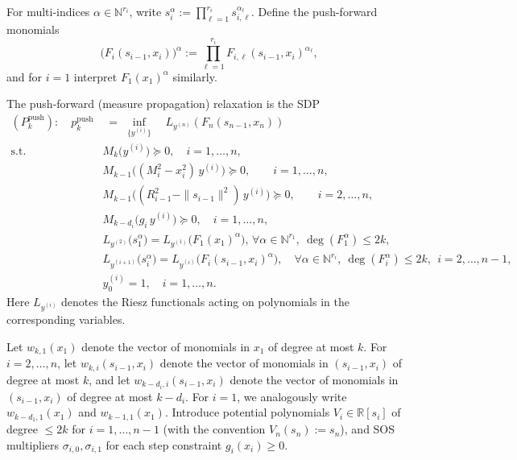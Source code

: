 \documentclass[11pt,a4paper]{article}
\theoremstyle{definition}
\begin{document}
For multi-indices $\alpha\in\mathbb{N}^{r_i}$, write $s_i^\alpha:=\prod_{\ell=1}^{r_i} s_{i,\ell}^{\alpha_\ell}$.
Define the push-forward monomials
\[
\big(F_i(s_{i-1},x_i)\big)^\alpha := \prod_{\ell=1}^{r_i} F_{i,\ell}(s_{i-1},x_i)^{\alpha_\ell},
\]
and for $i=1$ interpret $F_1(x_1)^\alpha$ similarly.

The push-forward (measure propagation) relaxation is the SDP
\begin{equation}\label{eq:push-forward-primal}
\begin{aligned}
(P_k^{\mathrm{push}}):\quad 
p_k^{\mathrm{push}}& \;=\; \inf_{\{y^{(i)}\}}
\quad L_{y^{(n)}}(F_n(s_{n-1},x_n)) \\
\text{s.t.}\quad 
& M_k\!\big(y^{(i)}\big)\succeq 0,\quad i=1,\dots,n, \\
& M_{k-1}\bigl((M_i^2-x_i^2)\,y^{(i)}\bigr) \succeq 0,\qquad i=1,\dots,n,\\
& M_{k-1}\bigl((R_{i-1}^2-\|s_{i-1}\|^2)\,y^{(i)}\bigr) \succeq 0,\qquad i=2,\dots,n,\\
& M_{k-d_i}\!\big(g_i\,y^{(i)}\big)\succeq 0,\quad i=1,\dots,n, \\
& L_{y^{(2)}}\!\big(s_{1}^\alpha\big) = L_{y^{(1)}}\!\big(F_1(x_1)^\alpha\big),
\, \forall \alpha\in\mathbb{N}^{r_1},\ \deg(F_1^{\alpha})\le 2k,\\
& L_{y^{(i+1)}}\!\big(s_{i}^\alpha\big) = L_{y^{(i)}}\!\big(F_i(s_{i-1},x_i)^\alpha\big),
\quad \forall \alpha\in\mathbb{N}^{r_i},\ \deg(F_i^{\alpha})\le 2k,\ \ i=2,\dots,n-1,\\
& y^{(i)}_{0}=1,\quad i=1,\dots,n.
\end{aligned}
\end{equation}
Here $L_{y^{(i)}}$ denotes the Riesz functionals acting on polynomials in the
corresponding variables. 

Let $w_{k,1}(x_1)$ denote the vector of monomials in $x_1$ of degree at most $k$.
For $i=2,\dots,n$, let $w_{k,i}(s_{i-1},x_i)$ denote the vector of monomials in $(s_{i-1},x_i)$
of degree at most $k$, and let $w_{k-d_i,i}(s_{i-1},x_i)$ denote the vector of monomials in
$(s_{i-1},x_i)$ of degree at most $k-d_i$.
For $i=1$, we analogously write $w_{k-d_1,1}(x_1)$ and $w_{k-1,1}(x_1)$. Introduce potential polynomials $V_i \in \mathbb{R}[s_i]$ of degree $\le 2k$ for
$i=1,\dots,n-1$ (with the convention $V_n(s_n):=s_n$), and SOS multipliers
$\sigma_{i,0},\sigma_{i,1}$ for each step constraint $g_i(x_i)\ge 0$.
\end{document}
